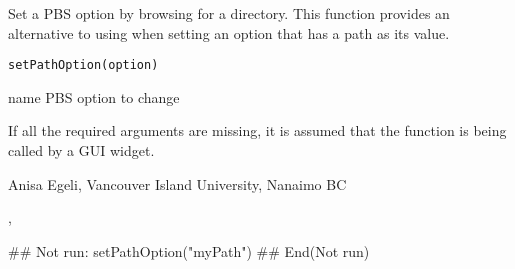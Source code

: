 \documentclass[letterpaper]{book}
\begin{document}
\begin{Description}\relax
Set a PBS option by browsing for a directory. This function provides 
an alternative to using  when setting an option 
that has a path as its value.
\end{Description}
\begin{Usage}
\begin{verbatim}
setPathOption(option)
\end{verbatim}
\end{Usage}
\begin{Arguments}
\begin{ldescription}
\item[\code{option}] name PBS option to change
\end{ldescription}
\end{Arguments}
\begin{Note}\relax
If all the required arguments are missing, it is assumed that 
the function is being called by a GUI widget.
\end{Note}
\begin{Author}\relax
Anisa Egeli, Vancouver Island University, Nanaimo BC
\end{Author}
\begin{SeeAlso}\relax
{}, 
\end{SeeAlso}
\begin{Examples}
\begin{ExampleCode}
## Not run: 
setPathOption("myPath")
## End(Not run)
\end{ExampleCode}
\end{Examples}
\end{document}
